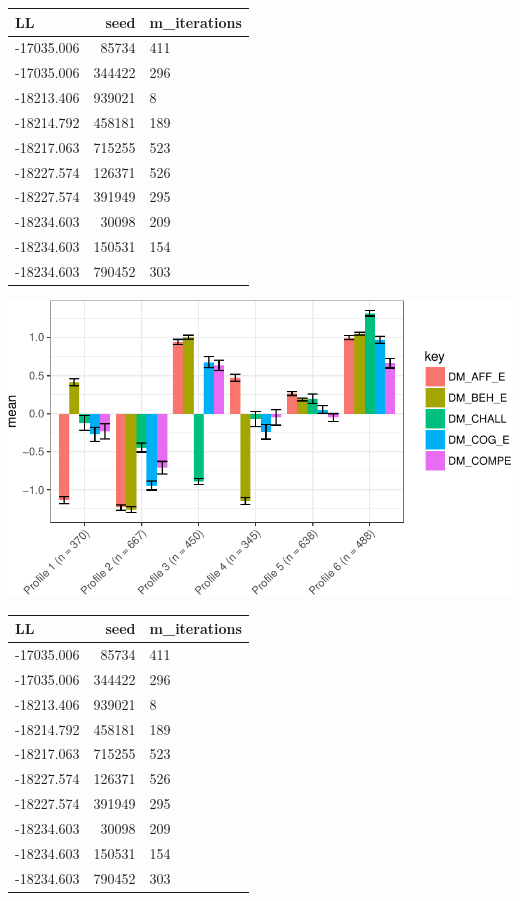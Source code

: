 \documentclass[]{msu-thesis}
\theoremstyle{definition}
\theoremstyle{definition}
\theoremstyle{definition}
\theoremstyle{remark}
\begin{document}
\begin{tabular}{l|r|l}
\hline
LL & seed & m\_iterations\\
\hline
-17035.006 & 85734 & 411\\
\hline
-17035.006 & 344422 & 296\\
\hline
-18213.406 & 939021 & 8\\
\hline
-18214.792 & 458181 & 189\\
\hline
-18217.063 & 715255 & 523\\
\hline
-18227.574 & 126371 & 526\\
\hline
-18227.574 & 391949 & 295\\
\hline
-18234.603 & 30098 & 209\\
\hline
-18234.603 & 150531 & 154\\
\hline
-18234.603 & 790452 & 303\\
\hline
\end{tabular}

\begin{center}\includegraphics[width=0.8\linewidth]{rosenberg-dissertation_files/figure-latex/m1_6p-1} \end{center}

\begin{tabular}{l|r|l}
\hline
LL & seed & m\_iterations\\
\hline
-17035.006 & 85734 & 411\\
\hline
-17035.006 & 344422 & 296\\
\hline
-18213.406 & 939021 & 8\\
\hline
-18214.792 & 458181 & 189\\
\hline
-18217.063 & 715255 & 523\\
\hline
-18227.574 & 126371 & 526\\
\hline
-18227.574 & 391949 & 295\\
\hline
-18234.603 & 30098 & 209\\
\hline
-18234.603 & 150531 & 154\\
\hline
-18234.603 & 790452 & 303\\
\hline
\end{tabular}
\end{document}
